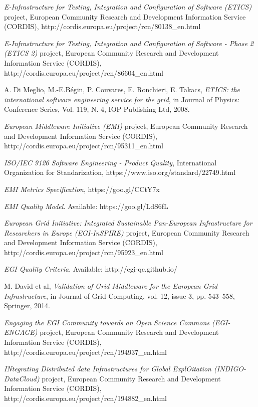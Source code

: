 \documentclass[journal]{IEEEtran}
\begin{document}
\begin{thebibliography}{1}
\emph{E-Infrastructure for Testing, Integration and Configuration of Software
(ETICS)} project, European Community Research and Development Information
Service (CORDIS), http://cordis.europa.eu/project/rcn/80138\_en.html

\emph{E-Infrastructure for Testing, Integration and Configuration of Software -
Phase 2 (ETICS 2)} project, European Community Research and Development
Information Service (CORDIS),
http://cordis.europa.eu/project/rcn/86604\_en.html

A. Di Meglio, M.-E.Bégin, P. Couvares, E. Ronchieri, E. Takacs, \emph{ETICS:
the international software engineering service for the grid}, in Journal of
Physics: Conference Series, Vol. 119, N. 4, IOP Publishing Ltd, 2008.

\emph{European Middleware Initiative (EMI)} project, European Community
Research and Development Information Service (CORDIS),
http://cordis.europa.eu/project/rcn/95311\_en.html

\emph{ISO/IEC 9126 Software Engineering - Product Quality}, International
Organization for Standarization, https://www.iso.org/standard/22749.html

\emph{EMI Metrics Specification}, https://goo.gl/CCtY7x


\emph{EMI Quality Model}. Available: https://goo.gl/LdS6fL

\emph{European Grid Initiative: Integrated Sustainable Pan-European
Infrastructure for Researchers in Europe (EGI-InSPIRE)} project, European
Community Research and Development Information Service (CORDIS),
http://cordis.europa.eu/project/rcn/95923\_en.html

\emph{EGI Quality Criteria}. Available: http://egi-qc.github.io/

M. David et al, \emph{Validation of Grid Middleware for the European Grid
Infrastructure}, in Journal of Grid Computing, vol. 12, issue 3, pp. 543–558,
Springer, 2014.

\emph{Engaging the EGI Community towards an Open Science Commons (EGI-ENGAGE)}
project, European Community Research and Development Information Service
(CORDIS), http://cordis.europa.eu/project/rcn/194937\_en.html

\emph{INtegrating Distributed data Infrastructures for Global ExplOitation
(INDIGO-DataCloud)} project, European Community Research and Development
Information Service (CORDIS),
http://cordis.europa.eu/project/rcn/194882\_en.html


\end{thebibliography}
\end{document}
